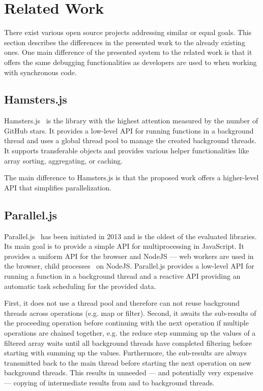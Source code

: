 \section{Related Work}\label{sec:related-work}
There exist various open source projects addressing similar or equal goals. This section describes the differences in the presented work to the already existing ones. One main difference of the presented system to the related work is that it offers the same debugging functionalities as developers are used to when working with synchronous code.

\subsection{Hamsters.js}
Hamsters.js~\cite{hamstersjs} is the library with the highest attention measured by the number of GitHub stars. It provides a low-level API for running functions in a background thread and uses a global thread pool to manage the created background threads. It supports transferable objects and provides various helper functionalities like array sorting, aggregating, or caching.

The main difference to Hamsters.js is that the proposed work offers a higher-level API that simplifies parallelization. 

\subsection{Parallel.js}
Parallel.js~\cite{SavitzkyMayr2016} has been initiated in 2013 and is the oldest of the evaluated libraries. Its main goal is to provide a simple API for multiprocessing in JavaScript. It provides a uniform API for the browser and NodeJS --- web workers are used in the browser, child processes~\cite{childProcess} on NodeJS. Parallel.js provides a low-level API for running a function in a background thread and a reactive API providing an automatic task scheduling for the provided data. 

First, it does not use a thread pool and therefore can not reuse background threads across operations (e.g. map or filter). Second, it awaits the sub-results of the proceeding operation before continuing with the next operation if multiple operations are chained together, e.g. the reduce step summing up the values of a filtered array waits until all background threads have completed filtering before starting with summing up the values. Furthermore, the sub-results are always transmitted back to the main thread before starting the next operation on new background threads. This results in unneeded --- and potentially very expensive --- copying of intermediate results from and to background threads.



